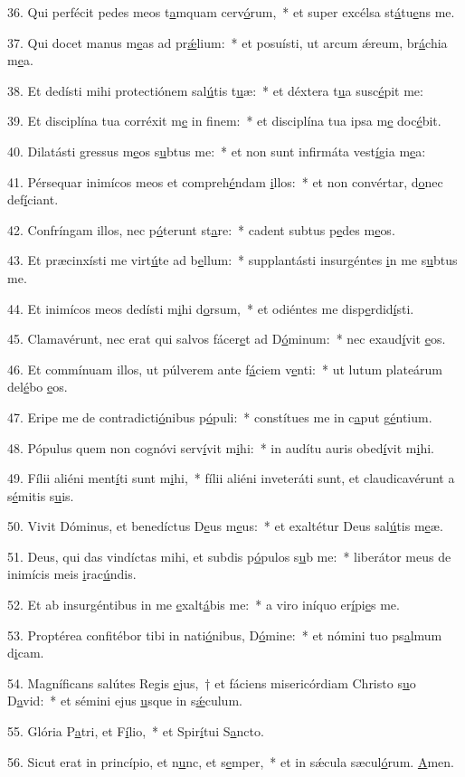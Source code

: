 36. Qui perfécit pedes meos t\uline{a}mquam cerv\uline{ó}rum,~* et super excélsa st\uline{á}tu\uline{e}ns me.\par 
37. Qui docet manus m\uline{e}as ad pr\uline{ǽ}lium:~* et posuísti, ut arcum ǽreum, br\uline{á}chia m\uline{e}a.\par 
38. Et dedísti mihi protectiónem sal\uline{ú}tis t\uline{u}æ:~* et déxtera t\uline{u}a susc\uline{é}pit me:\par 
39. Et disciplína tua corréxit m\uline{e} in f\uline{i}nem:~* et disciplína tua ipsa m\uline{e} doc\uline{é}bit.\par 
40. Dilatásti gressus m\uline{e}os s\uline{u}btus me:~* et non sunt infirmáta vest\uline{í}gia m\uline{e}a:\par 
41. Pérsequar inimícos meos et compreh\uline{é}ndam \uline{i}llos:~* et non convértar, d\uline{o}nec def\uline{í}ciant.\par 
42. Confríngam illos, nec p\uline{ó}terunt st\uline{a}re:~* cadent subtus p\uline{e}des m\uline{e}os.\par 
43. Et præcinxísti me virt\uline{ú}te ad b\uline{e}llum:~* supplantásti insurgéntes \uline{i}n me s\uline{u}btus me.\par 
44. Et inimícos meos dedísti m\uline{i}hi d\uline{o}rsum,~* et odiéntes me disp\uline{e}rdid\uline{í}sti.\par 
45. Clamavérunt, nec erat qui salvos fácer\uline{e}t ad D\uline{ó}minum:~* nec exaud\uline{í}vit \uline{e}os.\par 
46. Et commínuam illos, ut púlverem ante f\uline{á}ciem v\uline{e}nti:~* ut lutum plateárum del\uline{é}bo \uline{e}os.\par 
47. Eripe me de contradicti\uline{ó}nibus p\uline{ó}puli:~* constítues me in c\uline{a}put g\uline{é}ntium.\par 
48. Pópulus quem non cognóvi serv\uline{í}vit m\uline{i}hi:~* in audítu auris obed\uline{í}vit m\uline{i}hi.\par 
49. Fílii aliéni ment\uline{í}ti sunt m\uline{i}hi,~* fílii aliéni inveteráti sunt, et claudicavérunt a s\uline{é}mitis s\uline{u}is.\par 
50. Vivit Dóminus, et benedíctus D\uline{e}us m\uline{e}us:~* et exaltétur Deus sal\uline{ú}tis m\uline{e}æ.\par 
51. Deus, qui das vindíctas mihi, et subdis p\uline{ó}pulos s\uline{u}b me:~* liberátor meus de inimícis meis \uline{i}rac\uline{ú}ndis.\par 
52. Et ab insurgéntibus in me \uline{e}xalt\uline{á}bis me:~* a viro iníquo er\uline{í}pi\uline{e}s me.\par 
53. Proptérea confitébor tibi in nati\uline{ó}nibus, D\uline{ó}mine:~* et nómini tuo ps\uline{a}lmum d\uline{i}cam.\par 
54. Magníficans salútes Regis \uline{e}jus,~† et fáciens misericórdiam Christo s\uline{u}o D\uline{a}vid:~* et sémini ejus \uline{u}sque in s\uline{ǽ}culum.\par 
55. Glória P\uline{a}tri, et F\uline{í}lio,~* et Spir\uline{í}tui S\uline{a}ncto.\par 
56. Sicut erat in princípio, et n\uline{u}nc, et s\uline{e}mper,~* et in sǽcula sæcul\uline{ó}rum. \uline{A}men.\par 
